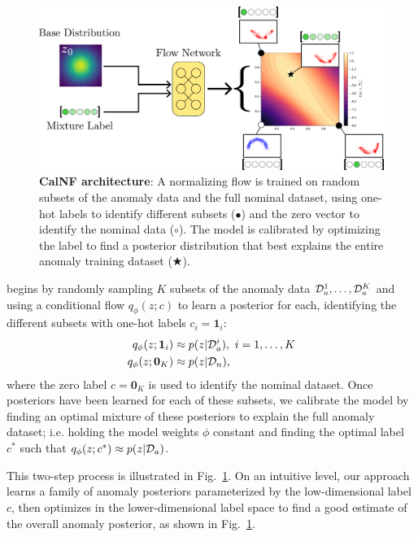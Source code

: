 \begin{figure}[htb]
    \centering
    \includegraphics[width=\linewidth]{images/icml/architecture.pdf}
    \caption{
        \textbf{CalNF architecture}: A normalizing flow is trained on random subsets of the anomaly data and the full nominal dataset, using one-hot labels to identify different subsets ($\bullet$) and the zero vector to identify the nominal data ($\circ$). The model is calibrated by optimizing the label to find a posterior distribution that best explains the entire anomaly training dataset ($\bigstar$).}
    \label{ch:icml:fig:architecture}
\end{figure}

\ouralg{} begins by randomly sampling $K$ subsets of the anomaly data $\mathcal{D}_a^1, \ldots, \mathcal{D}_a^K$ and using a conditional flow $q_\phi(z; c)$ to learn a posterior for each, identifying the different subsets with one-hot labels $c_i = \mathbf{1}_i$:
\begin{align*}
    q_\phi(z; \mathbf{1}_i) & \approx p(z | \mathcal{D}_a^i),\ i=1,\ldots,K \\
    q_\phi(z; \mathbf{0}_K) & \approx p(z | \mathcal{D}_n),
\end{align*}
where the zero label $c = \mathbf{0}_K$ is used to identify the nominal dataset. Once posteriors have been learned for each of these subsets, we calibrate the model by finding an optimal mixture of these posteriors to explain the full anomaly dataset; i.e. holding the model weights $\phi$ constant and finding the optimal label $c^*$ such that $q_\phi(z; c^*) \approx p(z | \mathcal{D}_a)$.

This two-step process is illustrated in Fig.~\ref{ch:icml:fig:architecture}. On an intuitive level, our approach learns a family of anomaly posteriors parameterized by the low-dimensional label $c$, then optimizes in the lower-dimensional label space to find a good estimate of the overall anomaly posterior, as shown in Fig.~\ref{ch:icml:fig:architecture}.

